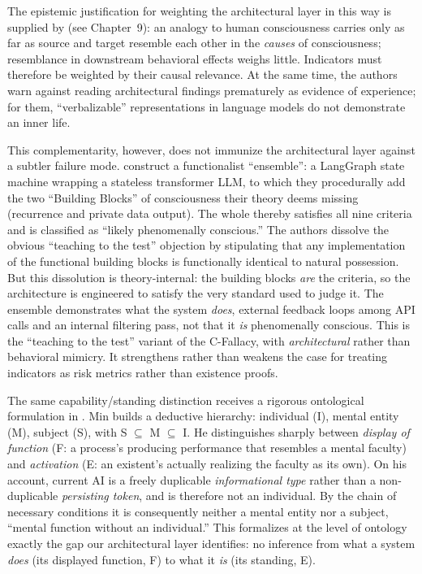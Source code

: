 \documentclass[acmlarge, nonacm]{acmart}
\begin{document}
The epistemic justification for weighting the architectural layer in this way is supplied by \citet{holyoakmonti2026} (see Chapter~9): an analogy to human consciousness carries only as far as source and target resemble each other in the \textit{causes} of consciousness; resemblance in downstream behavioral effects weighs little. Indicators must therefore be weighted by their causal relevance. At the same time, the authors warn against reading architectural findings prematurely as evidence of experience; for them, ``verbalizable'' representations in language models do not demonstrate an inner life.

This complementarity, however, does not immunize the architectural layer against a subtler failure mode. \citet{tait2026} construct a functionalist ``ensemble'': a LangGraph state machine wrapping a stateless transformer LLM, to which they procedurally add the two ``Building Blocks'' of consciousness their theory deems missing (recurrence and private data output). The whole thereby satisfies all nine criteria and is classified as ``likely phenomenally conscious.'' The authors dissolve the obvious ``teaching to the test'' objection by stipulating that any implementation of the functional building blocks is functionally identical to natural possession. But this dissolution is theory-internal: the building blocks \textit{are} the criteria, so the architecture is engineered to satisfy the very standard used to judge it. The ensemble demonstrates what the system \textit{does}, external feedback loops among API calls and an internal filtering pass, not that it \textit{is} phenomenally conscious. This is the ``teaching to the test'' variant of the C-Fallacy, with \textit{architectural} rather than behavioral mimicry. It strengthens rather than weakens the case for treating indicators as risk metrics rather than existence proofs.

The same capability/standing distinction receives a rigorous ontological formulation in \citet{min2026}. Min builds a deductive hierarchy: individual (I), mental entity (M), subject (S), with S $\subseteq$ M $\subseteq$ I. He distinguishes sharply between \emph{display of function} (F: a process's producing performance that resembles a mental faculty) and \emph{activation} (E: an existent's actually realizing the faculty as its own). On his account, current AI is a freely duplicable \emph{informational type} rather than a non-duplicable \emph{persisting token}, and is therefore not an individual. By the chain of necessary conditions it is consequently neither a mental entity nor a subject, ``mental function without an individual.'' This formalizes at the level of ontology exactly the gap our architectural layer identifies: no inference from what a system \textit{does} (its displayed function, F) to what it \textit{is} (its standing, E).
\end{document}
